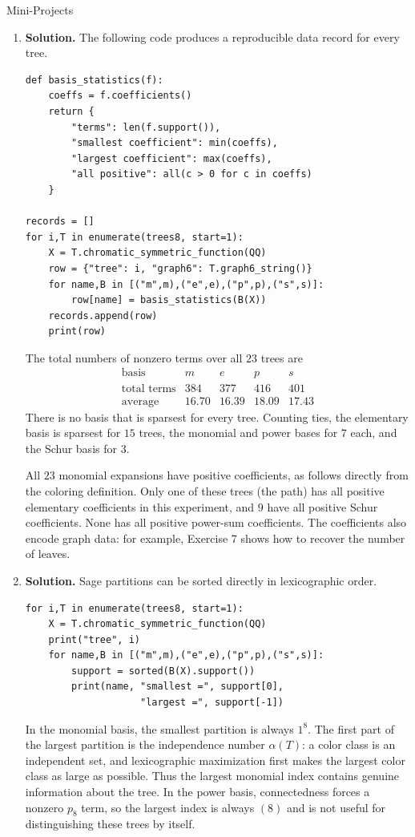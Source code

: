 \documentclass{article}
\begin{document}
\centerline{\Large Mini-Projects}
\begin{enumerate}
\item[A.]
\textbf{Solution.}
The following code produces a reproducible data record for every tree.
\begin{verbatim}
def basis_statistics(f):
    coeffs = f.coefficients()
    return {
        "terms": len(f.support()),
        "smallest coefficient": min(coeffs),
        "largest coefficient": max(coeffs),
        "all positive": all(c > 0 for c in coeffs)
    }

records = []
for i,T in enumerate(trees8, start=1):
    X = T.chromatic_symmetric_function(QQ)
    row = {"tree": i, "graph6": T.graph6_string()}
    for name,B in [("m",m),("e",e),("p",p),("s",s)]:
        row[name] = basis_statistics(B(X))
    records.append(row)
    print(row)
\end{verbatim}
The total numbers of nonzero terms over all $23$ trees are
\[
\begin{array}{c|rrrr}
\mbox{basis}&m&e&p&s\\ \hline
\mbox{total terms}&384&377&416&401\\
\mbox{average}&16.70&16.39&18.09&17.43
\end{array}
\]
There is no basis that is sparsest for every tree.  Counting ties, the
elementary basis is sparsest for $15$ trees, the monomial and power
bases for $7$ each, and the Schur basis for $3$.

All $23$ monomial expansions have positive coefficients, as follows
directly from the coloring definition.  Only one of these trees (the
path) has all positive elementary coefficients in this experiment,
and $9$ have all positive Schur coefficients.  None has all positive
power-sum coefficients.  The coefficients also encode graph data: for
example, Exercise 7 shows how to recover the number of leaves.

\item[B.]
\textbf{Solution.}
Sage partitions can be sorted directly in lexicographic order.
\begin{verbatim}
for i,T in enumerate(trees8, start=1):
    X = T.chromatic_symmetric_function(QQ)
    print("tree", i)
    for name,B in [("m",m),("e",e),("p",p),("s",s)]:
        support = sorted(B(X).support())
        print(name, "smallest =", support[0],
                    "largest =", support[-1])
\end{verbatim}
In the monomial basis, the smallest partition is always $1^8$.  The
first part of the largest partition is the independence number
$\alpha(T)$: a color class is an independent set, and lexicographic
maximization first makes the largest color class as large as possible.
Thus the largest monomial index contains genuine information about the
tree.  In the power basis, connectedness forces a nonzero $p_8$ term,
so the largest index is always $(8)$ and is not useful for
distinguishing these trees by itself.


\end{enumerate}
\end{document}
